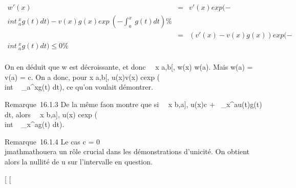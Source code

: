 \documentclass[]{article}
\begin{document}
\begin{align*} w'(x)& =&
v'(x)exp (-\\int ~
_a^xg(t) dt) - v(x)g(x)exp~
(-\int  _a^x~g(t) dt)\%&
\\ & =& (v'(x) -
v(x)g(x))exp (-\\int ~
_a^xg(t) dt) \leq 0 \%& \\
\end{align*}

On en déduit que w est décroissante, et donc
\forall~~x \in {[}a,b{[}, w(x) \leq w(a). Mais w(a) = v(a)
= c. On a donc, pour x \in {[}a,b{[}, u(x)\leq v(x) \leq
cexp (\\int ~
_a^xg(t) dt), ce qu'on voulait démontrer.

Remarque~16.1.3 De la même fa\ccon on montre que si
\forall~~x \in{]}b,a{]}, u(x)\leq c
+\int ~
_x^au(t)g(t) dt, alors
\forall~~x \in{]}b,a{]}, u(x)\leq
cexp (\\int ~
_x^ag(t) dt).

Remarque~16.1.4 Le cas c = 0 \\jmathmathouera un rôle crucial dans les
démonstrations d'unicité. On obtient alors la nullité de u sur
l'intervalle en question.

{[}
{[}
\end{document}
